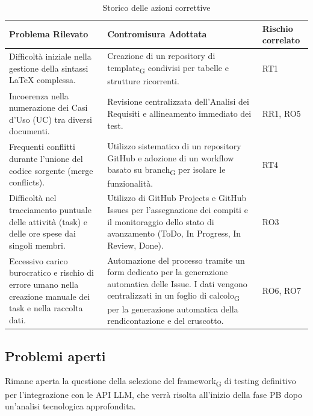 \begin{table}[H]
    \centering
    \renewcommand{\arraystretch}{1.3}
    \begin{tabularx}{\textwidth}{|p{6cm}|p{6.5cm}|X|}
        \hline
        \rowcolor{primarycolor!10}
        \textbf{Problema Rilevato} & \textbf{Contromisura Adottata} & \textbf{Rischio correlato} \\
        \hline
        Difficoltà iniziale nella gestione della sintassi LaTeX complessa. & Creazione di un repository di template\textsubscript{G} condivisi per tabelle e strutture ricorrenti. & RT1 \\
        \hline
        Incoerenza nella numerazione dei Casi d'Uso (UC) tra diversi documenti. & Revisione centralizzata dell'Analisi dei Requisiti e allineamento immediato dei test. & RR1, RO5 \\
        \hline
        Frequenti conflitti durante l'unione del codice sorgente (merge conflicts). & Utilizzo sistematico di un repository GitHub e adozione di un workflow basato su branch\textsubscript{G} per isolare le funzionalità. & RT4 \\
        \hline
        Difficoltà nel tracciamento puntuale delle attività (task) e delle ore spese dai singoli membri. & Utilizzo di GitHub Projects e GitHub Issues per l'assegnazione dei compiti e il monitoraggio dello stato di avanzamento (ToDo, In Progress, In Review, Done). & RO3 \\
        \hline
        Eccessivo carico burocratico e rischio di errore umano nella creazione manuale dei task e nella raccolta dati. & Automazione del processo tramite un form dedicato per la generazione automatica delle Issue. I dati vengono centralizzati in un foglio di calcolo\textsubscript{G} per la generazione automatica della rendicontazione e del cruscotto. & RO6, RO7 \\
        \hline
    \end{tabularx}
    \caption{Storico delle azioni correttive}
\end{table}

\subsection{Problemi aperti}
Rimane aperta la questione della selezione del framework\textsubscript{G} di testing definitivo per l'integrazione con le API LLM, che verrà risolta all'inizio della fase PB dopo un'analisi tecnologica approfondita.

\newpage
